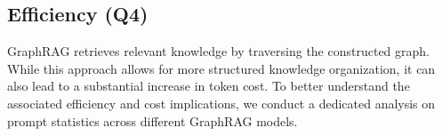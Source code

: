 \documentclass{article} %
\begin{document}


\subsection{Efficiency (Q4)}
GraphRAG retrieves relevant knowledge by traversing the constructed graph. While this approach allows for more structured knowledge organization, it can also lead to a substantial increase in token cost. To better understand the associated efficiency and cost implications, we conduct a dedicated analysis on prompt statistics across different GraphRAG models.
\end{document}

